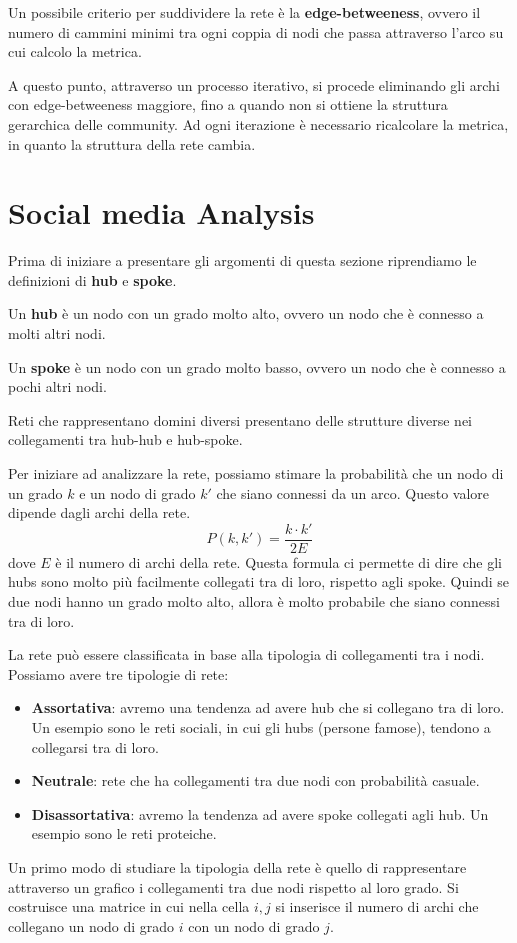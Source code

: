 Un possibile criterio per suddividere la rete è la \textbf{edge-betweeness}, ovvero
il numero di cammini minimi tra ogni coppia di nodi che passa attraverso l'arco
su cui calcolo la metrica.

A questo punto, attraverso un processo iterativo, si procede eliminando gli archi
con edge-betweeness maggiore, fino a quando non si ottiene la struttura gerarchica
delle community. Ad ogni iterazione è necessario ricalcolare la metrica, in quanto
la struttura della rete cambia.
\section{Social media Analysis}
Prima di iniziare a presentare gli argomenti di questa sezione riprendiamo
le definizioni di \textbf{hub} e \textbf{spoke}.
\begin{definizione}
    Un \textbf{hub} è un nodo con un grado molto alto, ovvero un nodo che è
    connesso a molti altri nodi.
\end{definizione}
\begin{definizione}
    Un \textbf{spoke} è un nodo con un grado molto basso, ovvero un nodo che è
    connesso a pochi altri nodi.
\end{definizione}
Reti che rappresentano domini diversi presentano delle strutture diverse nei
collegamenti tra hub-hub e hub-spoke.

Per iniziare ad analizzare la rete, possiamo stimare la probabilità che un nodo
di un grado $k$ e un nodo di grado $k'$ che siano connessi da un arco. Questo
valore dipende dagli archi della rete.
\begin{equation}
    P(k, k') = \frac{k \cdot k'}{2E}
\end{equation}
dove $E$ è il numero di archi della rete. Questa formula ci permette di dire che
gli hubs sono molto più facilmente collegati tra di loro, rispetto agli spoke.
Quindi se due nodi hanno un grado molto alto, allora è molto probabile che siano
connessi tra di loro.

La rete può essere classificata in base alla tipologia di collegamenti tra i nodi.
Possiamo avere tre tipologie di rete:
\begin{itemize}
    \item \textbf{Assortativa}: avremo una tendenza ad avere hub che si collegano
          tra di loro. Un esempio sono le reti sociali, in cui gli hubs (persone
          famose), tendono a collegarsi tra di loro.
    \item \textbf{Neutrale}: rete che ha collegamenti tra due nodi con probabilità
          casuale.
    \item \textbf{Disassortativa}: avremo la tendenza ad avere spoke collegati
          agli hub. Un esempio sono le reti proteiche.
\end{itemize}
Un primo modo di studiare la tipologia della rete è quello di rappresentare
attraverso un grafico i collegamenti tra due nodi rispetto al loro grado. Si
costruisce una matrice in cui nella cella $i, j$ si inserisce il numero di archi
che collegano un nodo di grado $i$ con un nodo di grado $j$.

